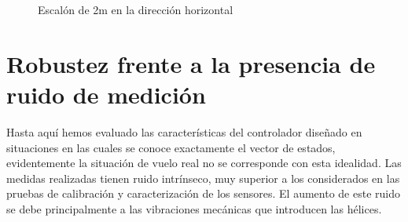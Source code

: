 \documentclass[main]{subfiles}
\begin{document}
\begin{figure}
  \centering
 
  \caption{Escal\'on de 2m en la direcci\'on horizontal}
  \label{fig:hov_esc_x}
\end{figure}

\section{Robustez frente a la presencia de ruido de medici\'on}

Hasta aqu\'i hemos evaluado las caracter\'isticas del controlador diseñado en situaciones en las cuales se conoce exactamente el vector de estados, evidentemente la situaci\'on de vuelo real no se corresponde con esta idealidad. Las medidas realizadas tienen ruido intr\'inseco, muy superior a los considerados en las pruebas de calibraci\'on y caracterizaci\'on de los sensores. El aumento de este ruido se debe principalmente a las vibraciones mec\'anicas que introducen las h\'elices.\\
\end{document}

